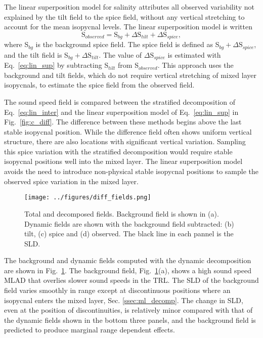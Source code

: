 \documentclass[preprint,NumberedRefs]{JASA}
\begin{document}
The linear superposition model for salinity attributes all observed variability not explained by the tilt field to the spice field, without any vertical stretching to account for the mean isopycnal levels. The linear superposition model is written
\begin{equation}
    \textrm{S}_{observed} = \textrm{S}_{bg} + \Delta \textrm{S}_{tilt} + \Delta \textrm{S}_{spice},
    \label{eq:lin_sup}
\end{equation}
where S$_{bg}$ is the background spice field. The spice field is defined as S$_{bg} + \Delta \textrm{S}_{spice}$, and the tilt field is S$_{bg} + \Delta \textrm{S}_{tilt}$. The value of $\Delta \textrm{S}_{spice}$ is estimated with Eq.~\eqref{eq:lin_sup} by subtracting S$_{tilt}$ from S$_{observed}$. This approach uses the background and tilt fields, which do not require vertical stretching of mixed layer isopycnals, to estimate the spice field from the observed field.

The sound speed field is compared between the stratified decomposition of Eq.~\eqref{eq:lin_inter} and the linear superposition model of Eq.~\eqref{eq:lin_sup} in Fig.~\ref{fig:c_diff}. The difference between these methods begins above the last stable isopycnal position. While the difference field often shows uniform vertical structure, there are also locations with significant vertical variation. Sampling this spice variation with the stratified decomposition would require stable isopycnal positions well into the mixed layer. The linear superposition model avoids the need to introduce non-physical stable isopycnal positions to sample the observed spice variation in the mixed layer.

\begin{figure}
\texttt{[image: ../figures/diff\_fields.png]}
        \caption{\label{fig:c_fields}{Total and decomposed fields. Background field is shown in (a). Dynamic fields are shown with the background field subtracted: (b) tilt, (c) spice and (d) observed. The black line in each pannel is the SLD.}}
\end{figure}

The background and dynamic fields computed with the dynamic decomposition are shown in Fig.~\ref{fig:c_fields}. The background field, Fig.~\ref{fig:c_fields}(a), shows a high sound speed MLAD that overlies slower sound speeds in the TRL. The SLD of the background field varies smoothly in range except at discontinuous positions where an isopycnal enters the mixed layer, Sec. \ref{ssec:ml_decomp}. The change in SLD, even at the position of discontinuities, is relatively minor compared with that of the dynamic fields shown in the bottom three panels, and the background field is predicted to produce marginal range dependent effects.
\end{document}
